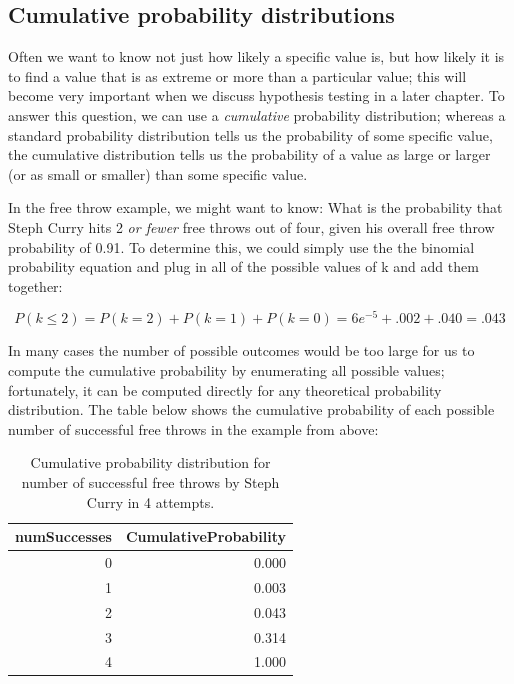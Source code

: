 \documentclass[12pt,]{book}
\theoremstyle{definition}
\theoremstyle{definition}
\theoremstyle{definition}
\theoremstyle{remark}
\begin{document}
\hypertarget{cumulative-probability-distributions}{%
\subsection{Cumulative probability distributions}\label{cumulative-probability-distributions}}

Often we want to know not just how likely a specific value is, but how likely it is to find a value that is as extreme or more than a particular value; this will become very important when we discuss hypothesis testing in a later chapter. To answer this question, we can use a \emph{cumulative} probability distribution; whereas a standard probability distribution tells us the probability of some specific value, the cumulative distribution tells us the probability of a value as large or larger (or as small or smaller) than some specific value.

In the free throw example, we might want to know: What is the probability that Steph Curry hits 2 \emph{or fewer} free throws out of four, given his overall free throw probability of 0.91. To determine this, we could simply use the the binomial probability equation and plug in all of the possible values of k and add them together:

\[
P(k\le2)= P(k=2) + P(k=1) + P(k=0) = 6e^{-5} + .002 + .040 = .043  
\]

In many cases the number of possible outcomes would be too large for us to compute the cumulative probability by enumerating all possible values; fortunately, it can be computed directly for any theoretical probability distribution. The table below shows the cumulative probability of each possible number of successful free throws in the example from above:

\begin{table}

\caption{\label{tab:unnamed-chunk-25}Cumulative probability distribution for number of successful free throws by Steph Curry in 4 attempts.}
\centering
\begin{tabular}[t]{r|r}
\hline
numSuccesses & CumulativeProbability\\
\hline
0 & 0.000\\
\hline
1 & 0.003\\
\hline
2 & 0.043\\
\hline
3 & 0.314\\
\hline
4 & 1.000\\
\hline
\end{tabular}
\end{table}
\end{document}

